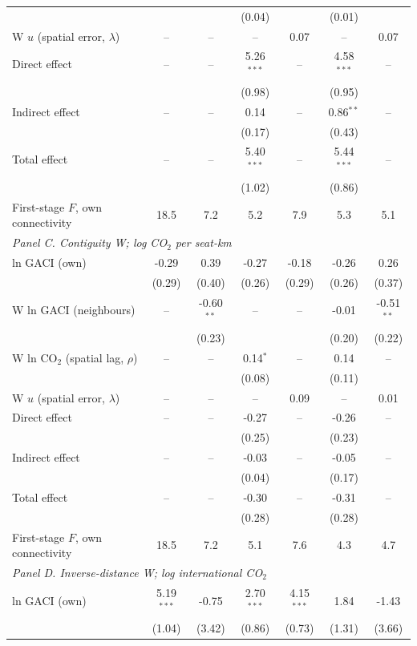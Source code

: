 \documentclass[12pt]{extarticle}
\begin{document}
\begin{table}[H]
{\begin{threeparttable}
\begin{tabular}{lcccccc}
   &  &  & (0.04) &  & (0.01) &  \\
  W $u$ (spatial error, $\lambda$) & -- & -- & -- & 0.07 & -- & 0.07 \\
  Direct effect & -- & -- & 5.26$^{***}$ & -- & 4.58$^{***}$ & -- \\
   &  &  & (0.98) &  & (0.95) &  \\
  Indirect effect & -- & -- & 0.14 & -- & 0.86$^{**}$ & -- \\
   &  &  & (0.17) &  & (0.43) &  \\
  Total effect & -- & -- & 5.40$^{***}$ & -- & 5.44$^{***}$ & -- \\
   &  &  & (1.02) &  & (0.86) &  \\
  First-stage $F$, own connectivity & 18.5 & 7.2 & 5.2 & 7.9 & 5.3 & 5.1 \\
\midrule
\multicolumn{7}{l}{\textit{Panel C. Contiguity W; log CO$_2$ per seat-km}} \\
  ln GACI (own) & -0.29 & 0.39 & -0.27 & -0.18 & -0.26 & 0.26 \\
   & (0.29) & (0.40) & (0.26) & (0.29) & (0.26) & (0.37) \\
  W ln GACI (neighbours) & -- & -0.60$^{**}$ & -- & -- & -0.01 & -0.51$^{**}$ \\
   &  & (0.23) &  &  & (0.20) & (0.22) \\
  W ln CO$_2$ (spatial lag, $\rho$) & -- & -- & 0.14$^{*}$ & -- & 0.14 & -- \\
   &  &  & (0.08) &  & (0.11) &  \\
  W $u$ (spatial error, $\lambda$) & -- & -- & -- & 0.09 & -- & 0.01 \\
  Direct effect & -- & -- & -0.27 & -- & -0.26 & -- \\
   &  &  & (0.25) &  & (0.23) &  \\
  Indirect effect & -- & -- & -0.03 & -- & -0.05 & -- \\
   &  &  & (0.04) &  & (0.17) &  \\
  Total effect & -- & -- & -0.30 & -- & -0.31 & -- \\
   &  &  & (0.28) &  & (0.28) &  \\
  First-stage $F$, own connectivity & 18.5 & 7.2 & 5.1 & 7.6 & 4.3 & 4.7 \\
\midrule
\multicolumn{7}{l}{\textit{Panel D. Inverse-distance W; log international CO$_2$}} \\
  ln GACI (own) & 5.19$^{***}$ & -0.75 & 2.70$^{***}$ & 4.15$^{***}$ & 1.84 & -1.43 \\
   & (1.04) & (3.42) & (0.86) & (0.73) & (1.31) & (3.66) \\

\end{tabular}
\end{threeparttable}}
\end{table}
\end{document}
